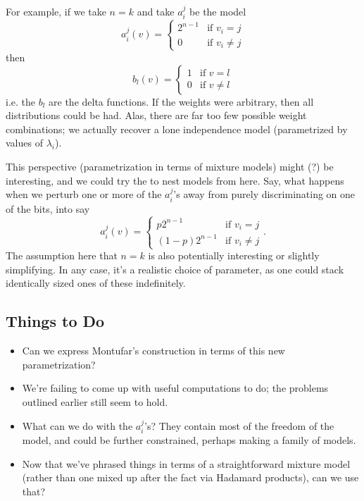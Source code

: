 \documentclass[11pt]{article}
\begin{document}
For example, if we take $n=k$ and take $a_i^j$ be the model
\[
    a_i^j(v) = \begin{cases}
        2^{n-1} & \text{if $v_i = j$}\\
        0 & \text{if $v_i \ne j$}
    \end{cases}
\]
then 
\[
    b_l(v) = \begin{cases}
        1 & \text{if $v = l$}\\
        0 & \text{if $v \ne l$}
    \end{cases}
\]
i.e. the $b_l$ are the delta functions.  If the weights were arbitrary, then all
distributions could be had.  Alas, there are far too few possible weight
combinations; we actually recover a lone independence model (parametrized by
values of $\lambda_i$).

This perspective (parametrization in terms of mixture models) might (?) be
interesting, and we could try the to nest models from here.  Say, what happens
when we perturb one or more of the $a_i^j$'s away from purely discriminating on
one of the bits, into say
\[
    a_i^j(v) = \begin{cases}
        p 2^{n-1} & \text{if $v_i = j$}\\
        (1 - p) 2^{n-1}  & \text{if $v_i \ne j$}
    \end{cases}.
\]
The assumption here that $n=k$ is also potentially interesting or slightly
simplifying.  In any case, it's a realistic choice of parameter, as one could
stack identically sized ones of these indefinitely.

\subsection{Things to Do}

\begin{itemize}
\item Can we express Montufar's construction in terms of this new parametrization?
\item We're failing to come up with useful computations to do; the problems
outlined earlier still seem to hold.
\item What can we do with the $a_i^j$'s?  They contain most of the freedom of
the model, and could be further constrained, perhaps making a family of models.
\item Now that we've phrased things in terms of a straightforward mixture model
(rather than one mixed up after the fact via Hadamard products), can we use
that?
\end{itemize}
\end{document}
